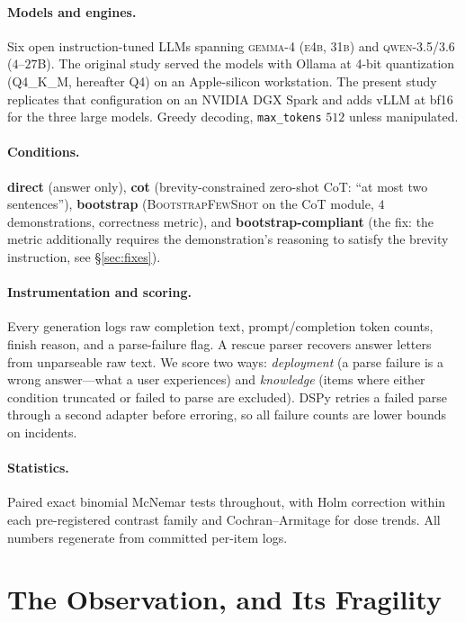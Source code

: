\documentclass[11pt]{article}
\newcommand{\bsfs}{\textsc{BootstrapFewShot}}
\begin{document}
\paragraph{Models and engines.} Six open instruction-tuned LLMs spanning
\textsc{gemma-4} (\textsc{e4b}, \textsc{31b}) and \textsc{qwen-3.5/3.6}
($4$--$27$B). The original study served the models with Ollama at 4-bit quantization
(Q4\_K\_M, hereafter Q4) on an Apple-silicon workstation. The present study replicates
that configuration on an NVIDIA DGX Spark and adds vLLM at bf16 for the three large models. Greedy decoding, \texttt{max\_tokens} $512$ unless
manipulated.
\paragraph{Conditions.} \textbf{direct} (answer only), \textbf{cot}
(brevity-constrained zero-shot CoT: ``at most two sentences''), \textbf{bootstrap}
(\bsfs{} on the CoT module, $4$ demonstrations, correctness metric), and
\textbf{bootstrap-compliant} (the fix: the metric additionally requires the
demonstration's reasoning to satisfy the brevity instruction, see \S\ref{sec:fixes}).
\paragraph{Instrumentation and scoring.} Every generation logs raw completion text,
prompt/completion token counts, finish reason, and a parse-failure flag. A rescue
parser recovers answer letters from unparseable raw text. We score two ways:
\emph{deployment} (a parse failure is a wrong answer---what a user experiences) and
\emph{knowledge} (items where either condition truncated or failed to parse are
excluded). DSPy retries a failed parse through a second adapter before erroring, so
all failure counts are lower bounds on incidents.
\paragraph{Statistics.} Paired exact binomial McNemar tests throughout, with Holm
correction within each pre-registered contrast family and Cochran--Armitage for
dose trends. All numbers regenerate from committed per-item logs.

\section{The Observation, and Its Fragility}\label{sec:fragility}
\end{document}

